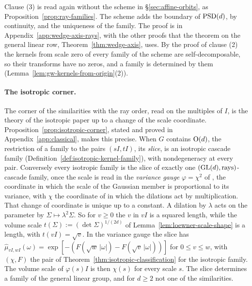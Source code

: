 Clause (3) is read again without the scheme in \S\ref{sec:affine-orbits}, as
Proposition~\ref{prop:ray-families}. The scheme adds the boundary of $\mathrm{PSD}(d)$, by continuity, and the
uniqueness of the family. The proof is in Appendix~\ref{app:wedge-axis-rays}, with the
other proofs that the theorem on the general linear row, Theorem~\ref{thm:wedge-axis}, uses.
By the proof of clause (2) the kernels from scale zero of every family of the scheme are self-decomposable, so their
transforms have no zeros, and a family is determined by them (Lemma~\ref{lem:gw-kernels-from-origin}(2)).

\paragraph{The isotropic corner.} The corner of the similarities with the ray order, read on the
multiples of $I$, is the theory of the isotropic paper up to a change of the scale coordinate.
Proposition~\ref{prop:isotropic-corner}, stated and proved in Appendix~\ref{app:classical}, makes
this precise. When $G$ contains $\mathrm{O}(d)$, the restriction of a family to the pairs $(sI, tI)$, its
\emph{slice}, is an isotropic cascade family (Definition~\ref{def:isotropic-kernel-family}), with
nondegeneracy at every pair. Conversely every isotropic family is the slice of exactly one
$(\mathrm{GL}(d), \text{rays})$-cascade family, once the scale is read in the \emph{variance gauge}
$\varphi = \chi^2$ of , the coordinate in which the scale of the Gaussian member
is proportional to its variance, with $\chi$ the coordinate of  in which the
dilations act by multiplication. That change of coordinate is unique up to a constant.
A dilation by $\lambda$ acts on the parameter by $\Sigma \mapsto \lambda^2\Sigma$. So for $v \ge 0$
the $v$ in $vI$ is a squared length, while the volume scale $t(\Sigma) := (\det\Sigma)^{1/(2d)}$ of
Lemma~\ref{lem:loewner-scale-shape} is a length, with $t(vI) = \sqrt v$. In the variance gauge the
slice has $\widehat\mu_{vI,wI}(\omega) = \exp[-(F(\sqrt w\,|\omega|) - F(\sqrt v\,|\omega|))]$ for
$0 \le v \le w$, with $(\chi, F)$ the pair of Theorem~\ref{thm:isotropic-classification} for the
isotropic family. The volume scale of $\varphi(s)I$ is then $\chi(s)$ for every scale $s$. The slice
determines a family of the general linear group, and for $d \ge 2$ not one of the similarities.

